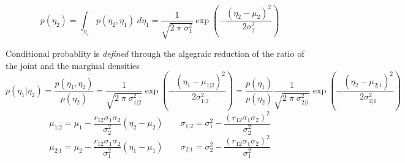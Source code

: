 \documentclass{article}         %
\theoremstyle{definition}
\theoremstyle{remark}
\begin{document}
\[
p(\eta_2) = 
\int_{\eta_1}
      p(\eta_2,\eta_1)
\;d\eta_1
 = \frac{1}{ \sqrt{2 \; \pi \; \sigma_1^2}} \exp\left( - \frac{(\eta_2 -
\mu_2)^2}{2 \sigma_2^2} \right)
\]

Conditional probablity is \textit{defined} through the algegraic
reduction of the ratio of the joint and the marginal densities
\[
p(\eta_1|\eta_2) =  \frac{p(\eta_1,\eta_2)  }{p(\eta_2) }
 = \frac{1}{ \sqrt{2 \; \pi \; \sigma_{1|2}^2}}
    \exp\left( - \frac{(\eta_1 - \mu_{1|2})^2}{2 \sigma_{1|2}^2} \right)
 = 
\frac{p(\eta_1)}{p(\eta_2)}
   \frac{1}{ \sqrt{2 \; \pi \; \sigma_{2|1}^2}}
    \exp\left( - \frac{(\eta_2 - \mu_{2|1})^2}{2 \sigma_{2|1}^2} \right)
\]
\[
\mu_{1|2} =  \mu_1 - 
       \frac{r_{12} \sigma_1 \sigma_2 }{\sigma_2^2}
       (\eta_2 - \mu_2)
\qquad
\sigma_{1|2} = 
\sigma_1^2  - 
       \frac{(r_{12} \sigma_1 \sigma_2 )^2}{\sigma_2^2}
\]
\[
\mu_{2|1} =  \mu_2 - 
       \frac{r_{12} \sigma_1 \sigma_2 }{\sigma_1^2}
       (\eta_1 - \mu_1)
\qquad
\sigma_{2|1} = 
\sigma_2^2  - 
       \frac{(r_{12} \sigma_1 \sigma_2 )^2}{\sigma_1^2}
\]
\end{document}
